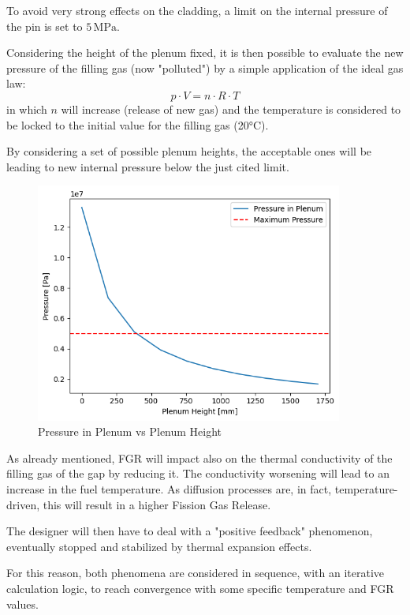 To avoid very strong effects on the cladding, a limit on the internal pressure of the pin is set to $5 \, \text{MPa}$.

Considering the height of the plenum fixed, it is then possible to evaluate the new pressure of the filling gas (now "polluted") by a simple application of the ideal gas law:
\begin{equation}
    p \cdot V = n \cdot R \cdot T
\end{equation}
in which $n$ will increase (release of new gas) and the temperature is considered to be locked to the initial value for the filling gas (20°C).

By considering a set of possible plenum heights, the acceptable ones will be leading to new internal pressure below the just cited limit.

\begin{figure}[h!]
    \centering
    \includegraphics[width=0.9\textwidth]{FGR_3.png}
    \caption{Pressure in Plenum vs Plenum Height}
    \label{fig:plenum_pressure}
\end{figure}

As already mentioned, FGR will impact also on the thermal conductivity of the filling gas of the gap by reducing it. The conductivity worsening will lead to an increase in the fuel temperature. As diffusion processes are, in fact, temperature-driven, this will result in a higher Fission Gas Release.

The designer will then have to deal with a "positive feedback" phenomenon, eventually stopped and stabilized by thermal expansion effects.

For this reason, both phenomena are considered in sequence, with an iterative calculation logic, to reach convergence with some specific temperature and FGR values.
